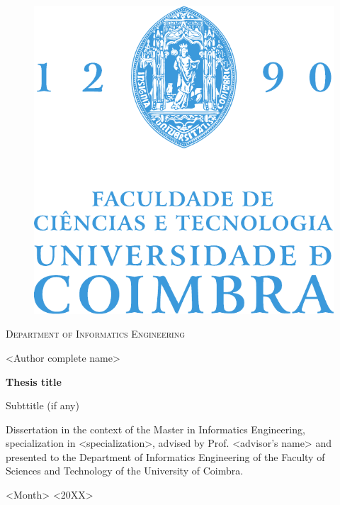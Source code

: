 \thispagestyle{empty}
\mbox{}
\vspace{1cm}

\begin{center}

\begin{figure}[h!]
	\begin{center}
	\includegraphics[width=0.35\linewidth]{frontmatter/FCTUC_logo.pdf}	
	\end{center}
\end{figure}

\small
\textsc{Department of Informatics Engineering}


\vspace{1.5cm}


\Large
<Author complete name>

\vspace{2cm}

\Huge
\textbf{\textsf{Thesis title}}

\LARGE
\textsf{Subttitle (if any)}

\vspace{3cm}

\normalsize

Dissertation in the context of the Master in Informatics Engineering, specialization in <specialization>, advised by Prof. <advisor's name> and presented to the Department of Informatics Engineering of the Faculty of Sciences and Technology of the University of Coimbra.

\vspace{1.5cm}

<Month> <20XX>


\end{center}

